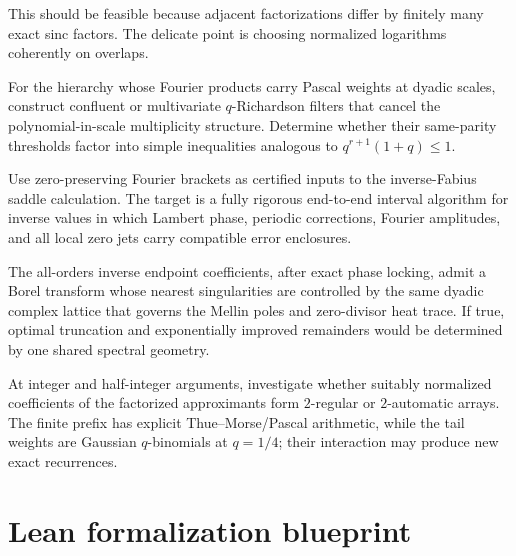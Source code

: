 \documentclass[11pt]{article}
\numberwithin{equation}{section}
\theoremstyle{definition}
\theoremstyle{remark}
\begin{document}
This should be feasible because adjacent factorizations differ by finitely many exact sinc
factors.  The delicate point is choosing normalized logarithms coherently on overlaps.

\begin{problem}\label{p3:prob:pascal}
For the hierarchy whose Fourier products carry Pascal weights at dyadic scales, construct
confluent or multivariate $q$-Richardson filters that cancel the polynomial-in-scale
multiplicity structure.  Determine whether their same-parity thresholds factor into simple
inequalities analogous to $q^{r+1}(1+q)\le1$.
\end{problem}

\begin{problem}\label{p3:prob:inverse-coupling}
Use zero-preserving Fourier brackets as certified inputs to the inverse-Fabius saddle
calculation.  The target is a fully rigorous end-to-end interval algorithm for inverse
values in which Lambert phase, periodic corrections, Fourier amplitudes, and all local zero
jets carry compatible error enclosures.
\end{problem}

\begin{conjecture}\label{p3:conj:resurgence}
The all-orders inverse endpoint coefficients, after exact phase locking, admit a Borel
transform whose nearest singularities are controlled by the same dyadic complex lattice
that governs the Mellin poles and zero-divisor heat trace.  If true, optimal truncation and
exponentially improved remainders would be determined by one shared spectral geometry.
\end{conjecture}

\begin{problem}\label{p3:prob:automatic-jets}
At integer and half-integer arguments, investigate whether suitably normalized coefficients
of the factorized approximants form $2$-regular or $2$-automatic arrays.  The finite prefix
has explicit Thue--Morse/Pascal arithmetic, while the tail weights are Gaussian
$q$-binomials at $q=1/4$; their interaction may produce new exact recurrences.
\end{problem}

\section{Lean formalization blueprint}\label{p3:sec:lean}
\end{document}
